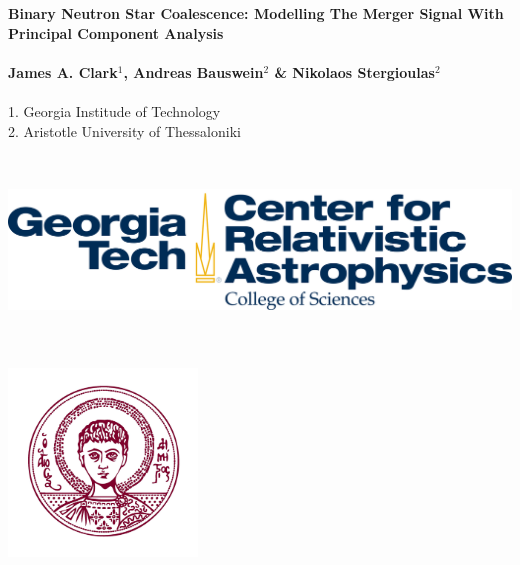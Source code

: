 \documentclass[a0,landscape]{a0poster}
\begin{document}


\begin{minipage}[b]{0.7\linewidth}
\veryHuge \color{NavyBlue} \textbf{Binary Neutron Star Coalescence: Modelling
The Merger Signal With Principal Component Analysis} \color{Black}\\ \\%
\huge \textbf{James A. Clark$^{1}$, Andreas Bauswein$^{2}$ \& Nikolaos Stergioulas$^{2}$}\\ \\%
\large 1. Georgia Institude of Technology\\ %
\large 2. Aristotle University of Thessaloniki\\ %
\end{minipage}
%
\hspace{10cm}
%
\begin{minipage}[b]{0.2\linewidth}
\includegraphics[height=5cm]{cra.png} \\ \\%
\includegraphics[height=5cm]{thessaloniki.jpg} \\ \\%
\end{minipage}
\end{document}
